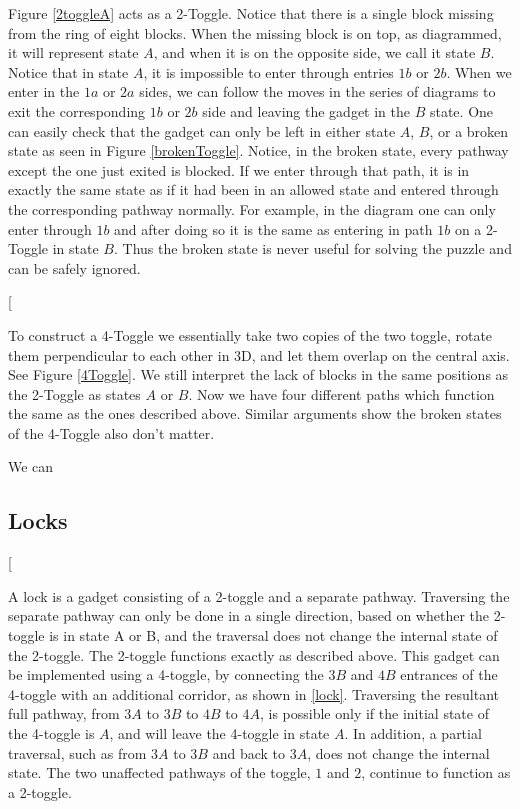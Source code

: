 \documentclass[11pt]{article}
\makeatletter
\gdef\xxx{\@ifnextchar[\xxx@lab\xxx@nolab}
\makeatother
\begin{document}
Figure \ref{2toggleA} acts as a 2-Toggle. Notice that there is a single block missing from the ring of eight blocks. When the missing block is on top, as diagrammed, it will represent state $A$, and when it is on the opposite side, we call it state $B$. Notice that in state $A$, it is impossible to enter through entries $1b$ or $2b$. When we enter in the $1a$ or $2a$ sides, we can follow the moves in the series of diagrams to exit the corresponding $1b$ or $2b$ side and leaving the gadget in the $B$ state. One can easily check that the gadget can only be left in either state $A$, $B$, or a broken state as seen in Figure \ref{brokenToggle}. Notice, in the broken state, every pathway except the one just exited is blocked. If we enter through that path, it is in exactly the same state as if it had been in an allowed state and entered through the corresponding pathway normally. For example, in the diagram one can only enter through $1b$ and after doing so it is the same as entering in path $1b$ on a 2-Toggle in state $B$. Thus the broken state is never useful for solving the puzzle and can be safely ignored.

\xxx{4 toggle}

To construct a 4-Toggle we essentially take two copies of the two toggle, rotate them perpendicular to each other in 3D, and let them overlap on the central axis. See Figure \ref{4Toggle}. We still interpret the lack of blocks in the same positions as the 2-Toggle as states $A$ or $B$. Now we have four different paths which function the same as the ones described above. Similar arguments show the broken states of the 4-Toggle also don't matter.

We can 

\subsection{Locks}

\xxx{lock figure}

A lock is a gadget consisting of a 2-toggle and a separate pathway. Traversing the separate pathway can only be done in a single direction, based on whether the 2-toggle is in state A or B, and the traversal does not change the internal state of the 2-toggle. The 2-toggle functions exactly
as described above. This gadget can be implemented using a 4-toggle, by
connecting the $3B$ and $4B$ entrances of the 4-toggle with an additional corridor, as shown in \ref{lock}.
Traversing the resultant full pathway, from $3A$ to $3B$ to $4B$ to $4A$, is possible only if the initial
state of the 4-toggle is $A$, and will leave the 4-toggle in state $A$. In addition, a partial traversal,
such as from $3A$ to $3B$ and back to $3A$, does not change the internal state. The two unaffected
pathways of the toggle, $1$ and $2$, continue to function as a 2-toggle.
\end{document}
